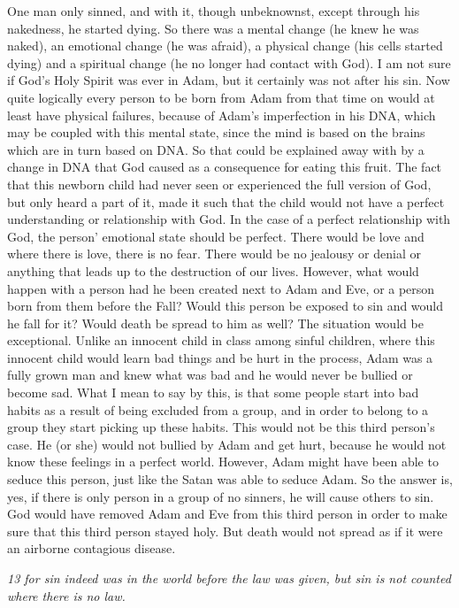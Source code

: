 One man only sinned, and with it, though unbeknownst, except through his
nakedness, he started dying. So there was a mental change (he knew he
was naked), an emotional change (he was afraid), a physical change (his
cells started dying) and a spiritual change (he no longer had contact
with God). I am not sure if God's Holy Spirit was ever in Adam, but it
certainly was not after his sin. Now quite logically every person to be
born from Adam from that time on would at least have physical failures,
because of Adam's imperfection in his DNA, which may be coupled with
this mental state, since the mind is based on the brains which are in
turn based on DNA. So that could be explained away with by a change in
DNA that God caused as a consequence for eating this fruit. The fact
that this newborn child had never seen or experienced the full version
of God, but only heard a part of it, made it such that the child would
not have a perfect understanding or relationship with God. In the case
of a perfect relationship with God, the person' emotional state should
be perfect. There would be love and where there is love, there is no
fear. There would be no jealousy or denial or anything that leads up to
the destruction of our lives. However, what would happen with a person
had he been created next to Adam and Eve, or a person born from them
before the Fall? Would this person be exposed to sin and would he fall
for it? Would death be spread to him as well? The situation would be
exceptional. Unlike an innocent child in class among sinful children,
where this innocent child would learn bad things and be hurt in the
process, Adam was a fully grown man and knew what was bad and he would
never be bullied or become sad. What I mean to say by this, is that some
people start into bad habits as a result of being excluded from a group,
and in order to belong to a group they start picking up these habits.
This would not be this third person's case. He (or she) would not
bullied by Adam and get hurt, because he would not know these feelings
in a perfect world. However, Adam might have been able to seduce this
person, just like the Satan was able to seduce Adam. So the answer is,
yes, if there is only person in a group of no sinners, he will cause
others to sin. God would have removed Adam and Eve from this third
person in order to make sure that this third person stayed holy. But
death would not spread as if it were an airborne contagious disease.

\emph{13 for sin indeed was in the world before the law was given, but
sin is not counted where there is no law.}

